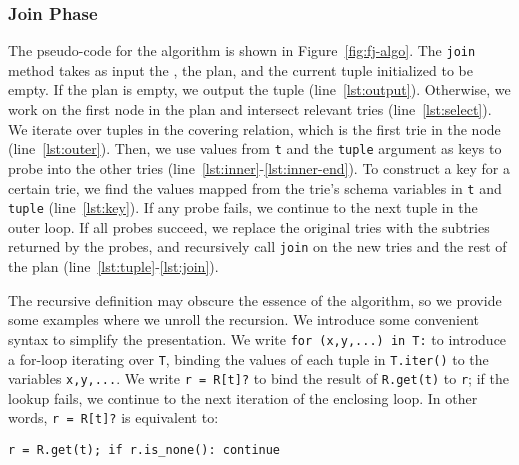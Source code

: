 \subsubsection*{Join Phase}
The pseudo-code for the \FJ algorithm is shown in Figure~\ref{fig:fj-algo}.
The \lstinline|join| method takes as input the \GHTs, the \FJ plan,
and the current tuple initialized to be empty.
If the plan is empty, we output the tuple (line~\ref{lst:output}).
Otherwise, we work on the first node in the plan
and intersect relevant tries (line~\ref{lst:select}).
We iterate over tuples in the covering relation,
which is the first trie in the node (line~\ref{lst:outer}).
%
%
Then, we use values from \lstinline|t|
and the \lstinline|tuple| argument
as keys to probe into the other tries
(line~\ref{lst:inner}-\ref{lst:inner-end}).
To construct a key for a certain trie,
we find the values mapped from the trie's schema variables
in \lstinline|t| and \lstinline|tuple| (line~\ref{lst:key}).
If any probe fails, we continue to the next tuple in the outer loop.
If all probes succeed, we replace the original tries with the
subtries returned by the probes,
and recursively call \lstinline|join|
on the new tries and the rest of the plan (line~\ref{lst:tuple}-\ref{lst:join}).

The recursive definition may obscure the essence of the \FJ algorithm,
so we provide some examples where we unroll the recursion.
We introduce some convenient syntax to simplify the presentation.
We write \lstinline|for (x,y,...) in T:|
to introduce a for-loop iterating over \lstinline|T|,
binding the values of each tuple in \lstinline|T.iter()|
to the variables \lstinline|x,y,...|.
We write \lstinline|r = R[t]?| to bind the result of
\lstinline|R.get(t)| to \lstinline|r|;
if the lookup fails, we continue to the next iteration of the
enclosing loop.
In other words, \texttt{r = R[t]?} is equivalent to:
%
\begin{lstlisting}
r = R.get(t); if r.is_none(): continue
\end{lstlisting}

